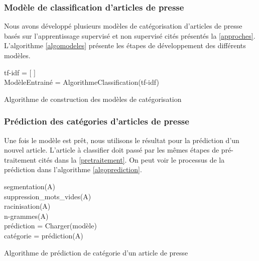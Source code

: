         \subsubsection{Modèle de classification d'articles de presse}
            Nous avons développé plusieurs modèles de catégorisation d'articles de presse basés sur l'apprentissage supervisé et non supervisé cités présentés la \autoref{approches}. L'algorithme \autoref{algomodeles} présente les étapes de développement des différents modèles.

            \begin{algorithm2e}[H]
            \label{algomodeles}
            \SetAlgoLined
            tf-idf = [ ]\\
            ModèleEntrainé = AlgorithmeClassification(tf-idf)\\
            \caption{Algorithme de construction des modèles de catégorisation}
            \end{algorithm2e}

        \subsubsection{Prédiction des catégories d'articles de presse}
            Une fois le modèle est prêt, nous utilisons le résultat pour la prédiction d'un nouvel article. L'article à classifier doit passé par les mêmes étapes de pré-traitement cités dans la \autoref{pretraitement}. On peut voir le processus de la prédiction dans l'algorithme \autoref{algoprediction}.

            \begin{algorithm2e}[H]
            \label{algoprediction}
            \SetAlgoLined
            segmentation(A)\\
            suppression\_mots\_vides(A)\\
            racinisation(A)\\
            n-grammes(A)\\
            prédiction = Charger(modèle)\\
            catégorie = prédiction(A)\\
            \caption{Algorithme de prédiction de catégorie d'un article de presse}
            \end{algorithm2e}

